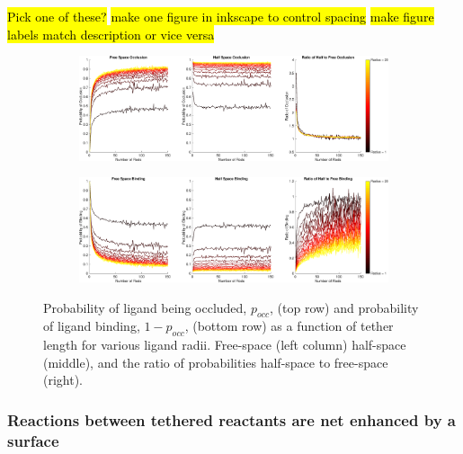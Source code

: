 \documentclass[../../AdvancementSummary.tex]{subfiles}
\begin{document}
\hl{Pick one of these?}
\hl{make one figure in inkscape to control spacing}
\hl{make figure labels match description or vice versa}
\begin{figure}[H]
    \begin{center}
        \begin{subfigure}{\linewidth}
        		\includegraphics[width=\linewidth]{ResultsFigures/BindingSurfaceFactor/OcclusionVSN.eps}
        		\caption{}
        \end{subfigure}
        	\begin{subfigure}{\linewidth}
        		\includegraphics[width=\linewidth]{ResultsFigures/BindingSurfaceFactor/BindingVSN.eps}
        		\caption{}
        \end{subfigure}
        \caption{Probability of ligand being occluded, $p_{occ}$, (top row) and probability of ligand binding, $1-p_{occ}$, (bottom row) as a function of tether length for various ligand radii. Free-space (left column) half-space (middle), and the ratio of probabilities half-space to free-space (right). \label{fig: OcclusionVSN} }
       \end{center}
\end{figure}

\subsubsection{Reactions between tethered reactants are net enhanced by a surface}
\end{document}
